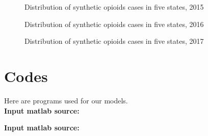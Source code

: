 \documentclass{mcmthesis}
\numberwithin{equation}{section}
\numberwithin{figure}{section}
\numberwithin{table}{section}
\theoremstyle{mydef}
\begin{document}
\begin{appendices}
\begin{figure}[H]
  \caption{Distribution of synthetic opioids cases in five states, 2015}
  \label{figop15}
\end{figure}
\begin{figure}[H]
  \caption{Distribution of synthetic opioids cases in five states, 2016}
  \label{figop16}
\end{figure}
\begin{figure}[H]
  \caption{Distribution of synthetic opioids cases in five states, 2017}
  \label{figop17}
\end{figure}


\section{Codes}

Here are programs used for our models.\\

\textbf{\textcolor[rgb]{0.98,0.00,0.00}{Input matlab source:}}


\textbf{\textcolor[rgb]{0.98,0.00,0.00}{Input matlab source:}}


\end{appendices}
\end{document}
